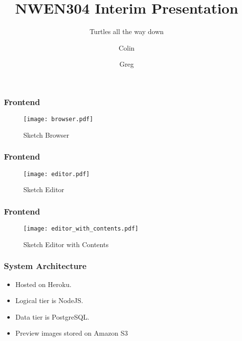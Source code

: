 \documentclass{beamer}
\title{NWEN304 Interim Presentation}
\subtitle{Turtles all the way down}
\author{Colin \and Greg}
\date{}
\begin{document}
  \begin{frame}
    \titlepage
  \end{frame}

  \begin{frame}
    \frametitle{Frontend}
    \begin{figure}[h]
      \centering
      \texttt{[image: browser.pdf]}
      \caption{Sketch Browser}
      \label{fig:axbgrid}
    \end{figure}
  \end{frame}

  \begin{frame}
    \frametitle{Frontend}
    \begin{figure}[h]
      \centering
      \texttt{[image: editor.pdf]}
      \caption{Sketch Editor}
      \label{fig:axbgrid}
    \end{figure}
  \end{frame}

  \begin{frame}
    \frametitle{Frontend}
    \begin{figure}[h]
      \centering
      \texttt{[image: editor\_with\_contents.pdf]}
      \caption{Sketch Editor with Contents}
      \label{fig:axbgrid}
    \end{figure}
  \end{frame}

  \begin{frame}
    \frametitle{System Architecture}
    \begin{itemize}
      \item Hosted on Heroku.
      \item Logical tier is NodeJS.
      \item Data tier is PostgreSQL.
      \item Preview images stored on Amazon S3
    \end{itemize}
  \end{frame}
\end{document}
